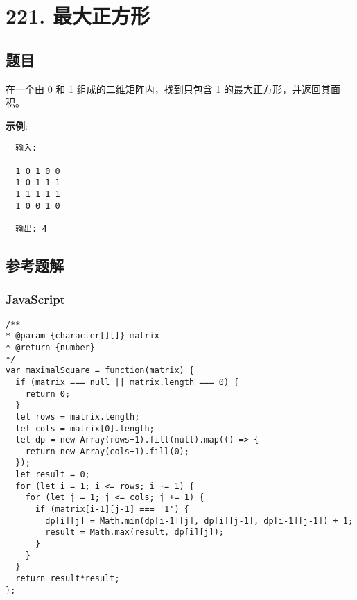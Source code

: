 \newpage
\section{221. 最大正方形}
\label{leetcode:221}

\subsection{题目}

在一个由 0 和 1 组成的二维矩阵内，找到只包含 1 的最大正方形，并返回其面积。

\textbf{示例}:

\begin{verbatim}
  输入:

  1 0 1 0 0
  1 0 1 1 1
  1 1 1 1 1
  1 0 0 1 0

  输出: 4
\end{verbatim}

\subsection{参考题解}

\subsubsection{JavaScript}

\begin{verbatim}
/**
* @param {character[][]} matrix
* @return {number}
*/
var maximalSquare = function(matrix) {
  if (matrix === null || matrix.length === 0) {
    return 0;
  }
  let rows = matrix.length;
  let cols = matrix[0].length;
  let dp = new Array(rows+1).fill(null).map(() => {
    return new Array(cols+1).fill(0);
  });
  let result = 0;
  for (let i = 1; i <= rows; i += 1) {
    for (let j = 1; j <= cols; j += 1) {
      if (matrix[i-1][j-1] === '1') {
        dp[i][j] = Math.min(dp[i-1][j], dp[i][j-1], dp[i-1][j-1]) + 1;
        result = Math.max(result, dp[i][j]);
      }
    }
  }
  return result*result;
};
\end{verbatim}
